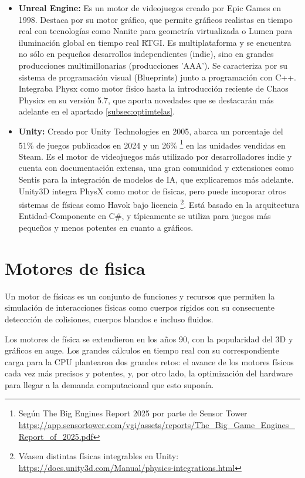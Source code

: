 \begin{itemize}
\item \textbf{Unreal Engine:}
Es un motor de videojuegos creado por Epic Games en 1998.  Destaca por su motor gráfico, que permite gráficos realistas en tiempo real con tecnologías como Nanite para geometría virtualizada o Lumen para iluminación global en tiempo real RTGI. Es multiplataforma y se encuentra no sólo en pequeños desarrollos independientes (indie), sino en grandes producciones multimillonarias (producciones 'AAA'). Se caracteriza por su sistema de programación visual (Blueprints) junto a programación con C++. Integraba Physx como motor físico hasta la introducción reciente de Chaos Physics en su versión 5.7, que aporta novedades que se destacarán más adelante en el apartado \ref{subsec:optimtelas}.

\item \textbf{Unity:}
Creado por Unity Technologies en 2005, abarca un porcentaje del 51\% de juegos publicados en 2024 y un 26\% \footnote{Según The Big Engines Report 2025 por parte de Sensor Tower \url{https://app.sensortower.com/vgi/assets/reports/The_Big_Game_Engines_Report_of_2025.pdf}} en las unidades vendidas en Steam. Es el motor de videojuegos más utilizado por desarrolladores indie y cuenta con documentación extensa, una gran comunidad y extensiones como Sentis para la integración de modelos de IA, que explicaremos más adelante. Unity3D integra PhysX como motor de físicas, pero puede incoporar otros sistemas de físicas como Havok bajo licencia \footnote{Véasen distintas físicas integrables en Unity: \url{https://docs.unity3d.com/Manual/physics-integrations.html}}. Está basado en la arquitectura Entidad-Componente en C\#, y típicamente se utiliza para juegos más pequeños y menos potentes en cuanto a gráficos.
\end{itemize}

\section{Motores de fisica}
\label{sec:motfisicas}

Un motor de físicas es un conjunto de funciones y recursos que permiten la simulación de interacciones físicas como cuerpos rígidos con su consecuente deteccción de colisiones, cuerpos blandos e incluso fluidos. %
\newline

Los motores de física se extendieron en los años 90, con la popularidad del 3D y gráficos en auge. Los grandes cálculos en tiempo real con su correspondiente carga para la CPU plantearon dos grandes retos: el avance de los motores físicos cada vez más precisos y potentes, y, por otro lado, la optimización del hardware para llegar a la demanda computacional que esto suponía. \newline

